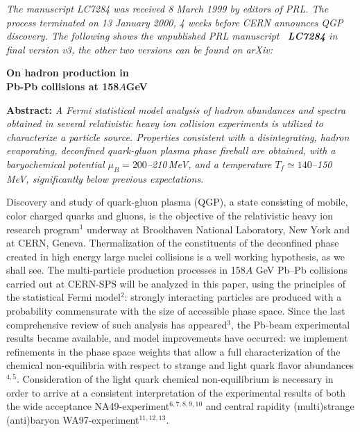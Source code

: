 \noindent \textit{The manuscript LC7284 was received 8 March 1999 by editors of PRL. The process terminated on 13 January 2000, 4 weeks before CERN announces QGP discovery. The following shows the unpublished PRL manuscript~\cite{Rafelski:1999xv} {\bf LC7284} in final version v3, the other two versions can be found on arXiv:}\\[-0.7cm]
%
\begin{mdframed}[linecolor=gray,roundcorner=12pt,backgroundcolor=Dandelion!15,linewidth=1pt,leftmargin=0cm,rightmargin=0cm,topline=true,bottomline=true,skipabove=12pt]\relax%
%
\begin{center}
{\large {\bf On hadron production in\\[0.2cm] Pb-Pb collisions at 158$A$\;GeV\\[0.2cm]}}
\end{center}

{\bf Abstract:} \textit{A Fermi statistical model analysis of hadron abundances and spectra obtained in several relativistic heavy ion collision experiments is utilized to characterize a particle source. Properties consistent with a disintegrating, hadron evaporating, deconfined quark-gluon plasma phase fireball are obtained, with a baryochemical potential $\mu_{B}=200$--210\,MeV, and a temperature $T_f\simeq 140$--150\,MeV, significantly below previous expectations.}

Discovery and study of quark-gluon plasma (QGP), a state consisting of mobile, color charged quarks and gluons, is the objective of the relativistic heavy ion research program$^1$ underway at Brookhaven National Laboratory, New York and at CERN, Geneva. Thermalization of the constituents of the deconfined phase created in high energy large nuclei collisions is a well working hypothesis, as we shall see. The multi-particle production processes in 158$A$ GeV Pb--Pb collisions carried out at CERN-SPS will be analyzed in this paper, using the principles of the statistical Fermi model$^2$: strongly interacting particles are produced with a probability commensurate with the size of accessible phase space. Since the last comprehensive review of such analysis has appeared$^3$, the Pb-beam experimental results became available, and model improvements have occurred: we implement refinements in the phase space weights that allow a full characterization of the chemical non-equilibria with respect to strange and light quark flavor abundances$^{4,5}$. Consideration of the light quark chemical non-equilibrium is necessary in order to arrive at a consistent interpretation of the experimental results of both the wide acceptance NA49-experiment$^{6,7,8,9,10}$ and central rapidity (multi)strange (anti)baryon WA97-experiment$^{11,12,13}$.


\end{mdframed}
